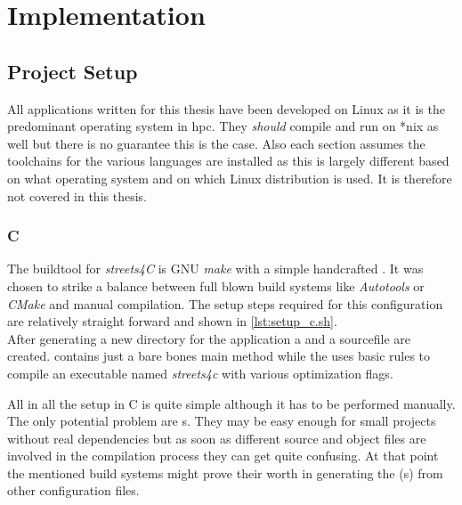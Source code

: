 \chapter{Implementation}
\label{ch:Implementation}


\setcounter{section}{-1}
\section{Project Setup}
\label{sec:Implementation::Setup}

All applications written for this thesis have been developed on Linux as it is the predominant operating system in \gls{hpc}. They \textit{should} compile and run on *nix as well but there is no guarantee this is the case. Also each section assumes the toolchains for the various languages are installed as this is largely different based on what operating system and on which Linux distribution is used. It is therefore not covered in this thesis.

\subsection{C}
\label{subsec:Implementation::Setup::C}

The buildtool for \textit{streets4C} is GNU \textit{make} with a simple handcrafted . It was chosen to strike a balance between full blown build systems like \textit{Autotools} or \textit{CMake} and manual compilation. The setup steps required for this configuration are relatively straight forward and shown in \autoref{lst:setup_c.sh}.
\\


After generating a new directory for the application a  and a sourcefile are created.  contains just a bare bones main method while the  uses basic rules to compile an executable named \textit{streets4c} with various optimization flags.

All in all the setup in C is quite simple although it has to be performed manually. The only potential problem are s. They may be easy enough for small projects without real dependencies but as soon as different source and object files are involved in the compilation process they can get quite confusing. At that point the mentioned build systems might prove their worth in generating the (s) from other configuration files.

